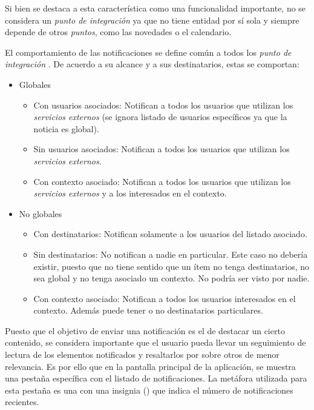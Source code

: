 Si bien se destaca a esta característica como una funcionalidad importante, no se considera un \textit{punto de integración} ya que no tiene entidad por sí sola y siempre depende de otros \textit{puntos}, como las novedades o el calendario.

El comportamiento de las notificaciones se define común a todos los \textit{punto de integración} .
De acuerdo a su alcance y a sus destinatarios, estas se comportan:
\begin{itemize}
\item Globales
\begin{itemize}
\item Con usuarios asociados: Notifican a todos los usuarios que utilizan los \textit{servicios externos} (se ignora listado de usuarios específicos ya que la noticia es global).
\item Sin usuarios asociados: Notifican a todos los usuarios que utilizan los \textit{servicios externos}.
\item Con contexto asociado: Notifican a todos los usuarios que utilizan los \textit{servicios externos} y a los interesados en el contexto.
\end{itemize}
\item No globales
\begin{itemize}
\item Con destinatarios: Notifican solamente a los usuarios del listado asociado.
\item Sin destinatarios: No notifican a nadie en particular. Este caso no debería existir, puesto que no tiene sentido que un ítem no tenga destinatarios, no sea global y no tenga asociado un contexto. No podría ser visto por nadie.
\item Con contexto asociado: Notifican a todos los usuarios interesados en el contexto. Además puede tener o no destinatarios particulares.
\end{itemize}
\end{itemize}

Puesto que el objetivo de enviar una notificación es el de destacar un cierto contenido, se considera importante que el usuario pueda llevar un seguimiento de lectura de los elementos notificados y resaltarlos por sobre otros de menor relevancia. Es por ello que en la pantalla principal de la aplicación, se muestra una pestaña específica con el listado de notificaciones. La metáfora utilizada para esta pestaña es una  con una insignia () que indica el número de notificaciones recientes.

